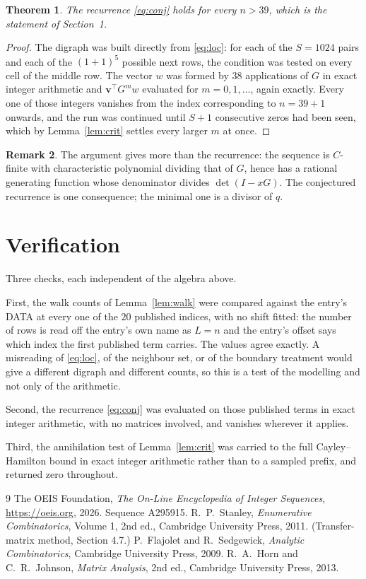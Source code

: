 \documentclass[11pt,a4paper]{article}
\theoremstyle{plain}
\newtheorem{theorem}{Theorem}
\theoremstyle{definition}
\newtheorem{remark}[theorem]{Remark}
\begin{document}
\begin{theorem}
The recurrence \eqref{eq:conj} holds for every $n>39$, which is the statement of
Section~1.
\end{theorem}

\begin{proof}
The digraph was built directly from \eqref{eq:loc}: for each of the $S=1024$ pairs and each
of the $(1+1)^{5}$ possible next rows, the condition was tested on every cell of
the middle row. The vector $w$ was formed by $38$ applications of $G$ in exact integer
arithmetic and $\mathbf{v}^{\!\top}G^{m}w$ evaluated for $m=0,1,\dots$, again exactly.
Every one of those integers vanishes from the index corresponding to $n=39+1$ onwards,
and the run was continued until $S+1$ consecutive zeros had been seen, which by
Lemma~\ref{lem:crit} settles every larger $m$ at once.
\end{proof}

\begin{remark}
The argument gives more than the recurrence: the sequence is $C$-finite with characteristic
polynomial dividing that of $G$, hence has a rational generating function whose denominator
divides $\det(I-xG)$. The conjectured recurrence is one consequence; the minimal one is a
divisor of $q$.
\end{remark}

\section{Verification}

Three checks, each independent of the algebra above.

First, the walk counts of Lemma~\ref{lem:walk} were compared against the entry's DATA at
every one of the $20$ published indices, with no shift fitted: the number of rows is
read off the entry's own name as $L=n$ and the entry's offset says which index the first
published term carries. The values agree exactly. A misreading of \eqref{eq:loc}, of the
neighbour set, or of the boundary treatment would give a different digraph and different
counts, so this is a test of the modelling and not only of the arithmetic.

Second, the recurrence \eqref{eq:conj} was evaluated on those published terms in exact
integer arithmetic, with no matrices involved, and vanishes wherever it applies.

Third, the annihilation test of Lemma~\ref{lem:crit} was carried to the full
Cayley--Hamilton bound in exact integer arithmetic rather than to a sampled prefix, and
returned zero throughout.

\begin{thebibliography}{9}
 The OEIS Foundation, \emph{The On-Line Encyclopedia of Integer
Sequences}, \url{https://oeis.org}, 2026. Sequence A295915.
 R.~P.~Stanley, \emph{Enumerative Combinatorics}, Volume 1, 2nd ed.,
Cambridge University Press, 2011. (Transfer-matrix method, Section 4.7.)
 P.~Flajolet and R.~Sedgewick, \emph{Analytic Combinatorics}, Cambridge
University Press, 2009.
 R.~A.~Horn and C.~R.~Johnson, \emph{Matrix Analysis}, 2nd ed., Cambridge
University Press, 2013.
\end{thebibliography}
\end{document}
